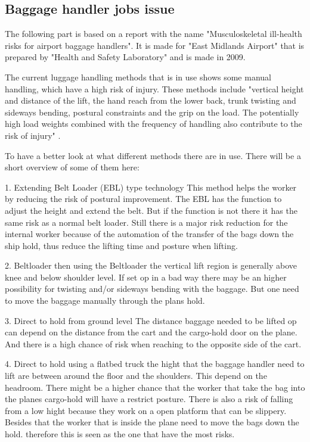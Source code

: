 \subsection{Baggage handler jobs issue}
The following part is based on a report with the name "Musculoskeletal ill-health risks for airport baggage handlers". It is made for "East Midlands Airport" that is prepared by "Health and Safety Laboratory" and is made in 2009.


The current luggage handling methods that is in use shows some manual handling, which have a high risk of injury. These methods include "vertical height and distance of the lift, the hand reach from the lower back, trunk twisting and sideways bending, postural constraints and the grip on the load. The potentially high load weights combined with the frequency of handling also contribute to the risk of injury" \citep{}.


To have a better look at what different methods there are in use. There will be a short overview of some of them here:


1. Extending Belt Loader (EBL) type technology \newline
This method helps the worker by reducing the risk of postural improvement. The EBL has the function to adjust the height and extend the belt. But if the function is not there it has the same risk as a normal belt loader. Still there is a major risk reduction for the internal worker because of the automation of the transfer of the bags down the ship hold, thus reduce the lifting time and posture when lifting.


2. Beltloader \newline
then using the Beltloader the vertical lift region is generally above knee and below shoulder level. If set op in a bad way there may be an higher possibility for twisting and/or sideways bending with the baggage. But one need to move the baggage manually through the plans hold.




3. Direct to hold from ground level \newline
The distance baggage needed to be lifted op can depend on the distance from the cart and the cargo-hold door on the plane. And there is a high chance of risk when reaching to the opposite side of the cart.

4. Direct to hold using a flatbed truck \newline
the hight that the baggage handler need to lift are between around the floor and the shoulders. This depend on the headroom. There might be a higher chance that the worker that take the bag into the planes cargo-hold will have a restrict posture. There is also a risk of falling from a low hight because they work on a open platform that can be slippery. Besides that the worker that is inside the plane need to move the bags down the hold. therefore this is seen as the one that have the most risks.



